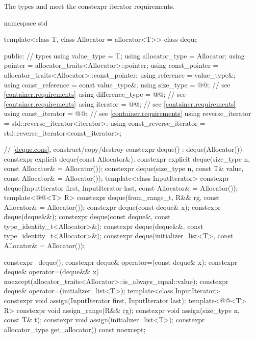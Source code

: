 \pnum
The types  and  meet
the constexpr iterator requirements.

\begin{codeblock}
namespace std {
  template<class T, class Allocator = allocator<T>>
  class deque {
  public:
    // types
    using value_type             = T;
    using allocator_type         = Allocator;
    using pointer                = allocator_traits<Allocator>::pointer;
    using const_pointer          = allocator_traits<Allocator>::const_pointer;
    using reference              = value_type&;
    using const_reference        = const value_type&;
    using size_type              = @@; // see \ref{container.requirements}
    using difference_type        = @@; // see \ref{container.requirements}
    using iterator               = @@; // see \ref{container.requirements}
    using const_iterator         = @@; // see \ref{container.requirements}
    using reverse_iterator       = std::reverse_iterator<iterator>;
    using const_reverse_iterator = std::reverse_iterator<const_iterator>;

    // \ref{deque.cons}, construct/copy/destroy
    constexpr deque() : deque(Allocator()) { }
    constexpr explicit deque(const Allocator&);
    constexpr explicit deque(size_type n, const Allocator& = Allocator());
    constexpr deque(size_type n, const T& value, const Allocator& = Allocator());
    template<class InputIterator>
      constexpr deque(InputIterator first, InputIterator last, const Allocator& = Allocator());
    template<@@<T> R>
      constexpr deque(from_range_t, R&& rg, const Allocator& = Allocator());
    constexpr deque(const deque& x);
    constexpr deque(deque&&);
    constexpr deque(const deque&, const type_identity_t<Allocator>&);
    constexpr deque(deque&&, const type_identity_t<Allocator>&);
    constexpr deque(initializer_list<T>, const Allocator& = Allocator());

    constexpr ~deque();
    constexpr deque& operator=(const deque& x);
    constexpr deque& operator=(deque&& x)
      noexcept(allocator_traits<Allocator>::is_always_equal::value);
    constexpr deque& operator=(initializer_list<T>);
    template<class InputIterator>
      constexpr void assign(InputIterator first, InputIterator last);
    template<@@<T> R>
      constexpr void assign_range(R&& rg);
    constexpr void assign(size_type n, const T& t);
    constexpr void assign(initializer_list<T>);
    constexpr allocator_type get_allocator() const noexcept;

}}
\end{codeblock}
